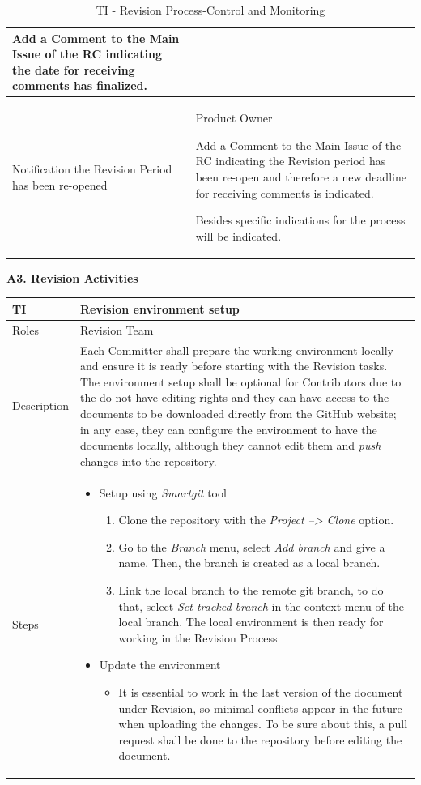 \documentclass{template/openetcs_article}
\begin{document}
\begin{table}[H]
\begin{tabular}{|m{3cm}|m{11cm}|}
Add a Comment to the Main Issue of the RC indicating the date for receiving comments has finalized.
\\\hline
Notification the Revision Period has been re-opened &
Product Owner

Add a Comment to the Main Issue of the RC indicating the Revision period has been re-open and therefore a new deadline for receiving comments is indicated.

Besides specific indications for the process will be indicated.
\\\hline
\end{tabular}
\caption{TI - Revision Process-Control and Monitoring}
\end{table}

\textbf{A3. Revision Activities}
\begin{table}[H]
\begin{tabular}{|m{2cm}|m{12cm}|}
\hline
\rowcolor{myblue}
TI & 
Revision environment setup
\\\hline
Roles &
Revision Team
\\\hline
Description &
Each Committer shall prepare the working environment locally and ensure it is ready before starting with the Revision tasks. The environment setup shall be optional for Contributors due to the do not have editing rights and they can have access to the documents to be downloaded directly from the GitHub website; in any case, they can configure the environment to have the documents locally, although they cannot edit them and {\it push} changes into the repository.
\\\hline
Steps &
\begin{itemize}
\item Setup using {\it Smartgit} tool
\begin{enumerate}
\item Clone the repository with the {\it Project --> Clone} option.
\item Go to the {\it Branch} menu, select {\it Add branch} and give a name. Then, the branch is created as a local branch.
\item Link the local branch to the remote git branch, to do that, select {\it Set tracked branch} in the context menu of the local branch. The local environment is then ready for working in the Revision Process
\end{enumerate}
\item Update the environment
\begin{itemize}
\item It is essential to work in the last version of the document under Revision, so minimal conflicts appear in the future when uploading the changes. To be sure about this, a pull request shall be done to the repository before editing the document.

\end{itemize}
\end{itemize}
\end{tabular}
\end{table}
\end{document}
